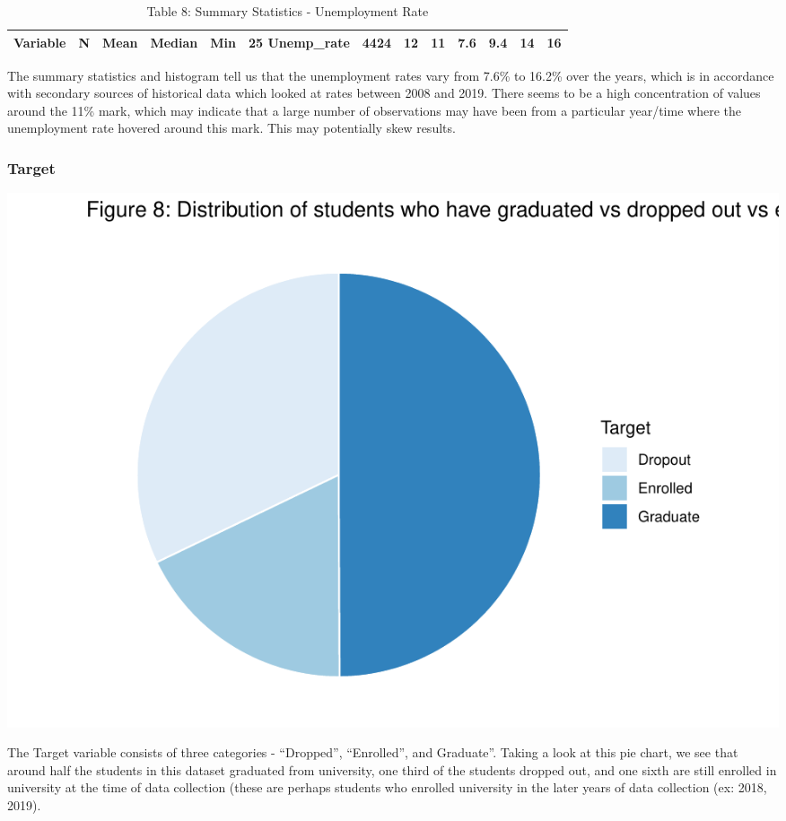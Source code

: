 \documentclass[
]{article}
\begin{document}
\begin{table}

\caption{\label{tab:unnamed-chunk-13}Table 8: Summary Statistics - Unemployment Rate}
\centering
\begin{tabular}[t]{llllllll}
\toprule
Variable & N & Mean & Median & Min & 25%
\midrule
Unemp_rate & 4424 & 12 & 11 & 7.6 & 9.4 & 14 & 16\\
\bottomrule
\end{tabular}
\end{table}

The summary statistics and histogram tell us that the unemployment rates
vary from 7.6\% to 16.2\% over the years, which is in accordance with
secondary sources of historical data which looked at rates between 2008
and 2019. There seems to be a high concentration of values around the
11\% mark, which may indicate that a large number of observations may
have been from a particular year/time where the unemployment rate
hovered around this mark. This may potentially skew results.

\hypertarget{target}{%
\subsubsection{Target}\label{target}}

\begin{center}\includegraphics{finalproj_files/figure-latex/unnamed-chunk-14-1} \end{center}

The Target variable consists of three categories - ``Dropped'',
``Enrolled'', and Graduate''. Taking a look at this pie chart, we see
that around half the students in this dataset graduated from university,
one third of the students dropped out, and one sixth are still enrolled
in university at the time of data collection (these are perhaps students
who enrolled university in the later years of data collection (ex: 2018,
2019).
\end{document}
